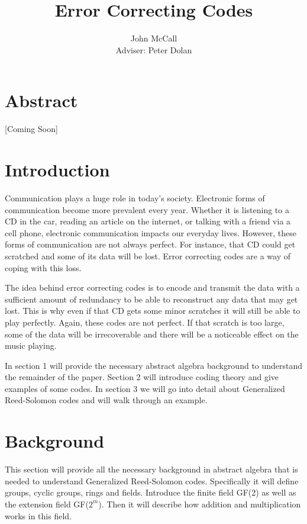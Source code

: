 \documentclass{article}
\title{Error Correcting Codes}
\author{John McCall\\Adviser: Peter Dolan}
\begin{document}

\maketitle

\section{Abstract}
[Coming Soon]

\section{Introduction}
Communication plays a huge role in today's society. Electronic forms of communication become more prevalent every year. Whether it is listening to a CD in the car, reading an article on the internet, or talking with a friend via a cell phone, electronic communication impacts our everyday lives. However, these forms of communication are not always perfect. For instance, that CD could get scratched and some of its data will be lost. Error correcting codes are a way of coping with this loss. 

The idea behind error correcting codes is to encode and transmit the data with a sufficient amount of redundancy to be able to reconstruct any data that may get lost. This is why even if that CD gets some minor scratches it will still be able to play perfectly. Again, these codes are not perfect. If that scratch is too large, some of the data will be irrecoverable and there will be a noticeable effect on the music playing.

In section 1 will provide the necessary abstract algebra background to understand the remainder of the paper. Section 2 will introduce coding theory and give examples of some codes. In section 3 we will go into detail about Generalized Reed-Solomon codes and will walk through an example.

\section{Background}
This section will provide all the necessary background in abstract algebra that is needed to understand Generalized Reed-Solomon codes. Specifically it will define groups, cyclic groups, rings and fields. Introduce the finite field GF(2) as well as the extension field GF($2^{m}$). Then it will describe how addition and multiplication works in this field.
\end{document}
